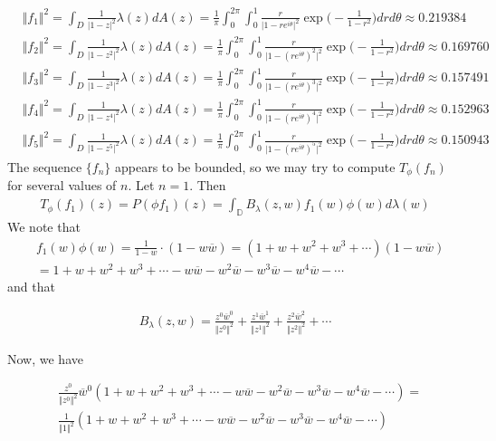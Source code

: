 \documentclass[12pt]{article}
\begin{document}
\begin{align*}
&\Vert f_1 \Vert^2 = \int_D \frac{1}{\vert 1 - z \vert^2} \lambda(z) dA(z) = \frac{1}{\pi} \int_0^{2\pi} \int_0^1 \frac{r}{\vert 1 - re^{i\theta} \vert^2} \exp\bigg(-\frac{1}{1-r^2}\bigg) dr d\theta \approx 0.219384 \\
&\Vert f_2 \Vert^2 = \int_D \frac{1}{\vert 1 - z^2 \vert^2} \lambda(z) dA(z) = \frac{1}{\pi} \int_0^{2\pi} \int_0^1 \frac{r}{\vert 1 - (re^{i\theta})^2 \vert^2} \exp\bigg(-\frac{1}{1-r^2}\bigg) dr d\theta \approx 0.169760 \\
&\Vert f_3 \Vert^2 = \int_D \frac{1}{\vert 1 - z^3 \vert^2} \lambda(z) dA(z) = \frac{1}{\pi} \int_0^{2\pi} \int_0^1 \frac{r}{\vert 1 - (re^{i\theta})^3 \vert^2} \exp\bigg(-\frac{1}{1-r^2}\bigg) dr d\theta \approx 0.157491\\
&\Vert f_4 \Vert^2 = \int_D \frac{1}{\vert 1 - z^4 \vert^2} \lambda(z) dA(z) = \frac{1}{\pi} \int_0^{2\pi} \int_0^1 \frac{r}{\vert 1 - (re^{i\theta})^4 \vert^2} \exp\bigg(-\frac{1}{1-r^2}\bigg) dr d\theta \approx 0.152963\\
&\Vert f_5 \Vert^2 = \int_D \frac{1}{\vert 1 - z^5 \vert^2} \lambda(z) dA(z) = \frac{1}{\pi} \int_0^{2\pi} \int_0^1 \frac{r}{\vert 1 - (re^{i\theta})^5 \vert^2} \exp\bigg(-\frac{1}{1-r^2}\bigg) dr d\theta \approx 0.150943
\end{align*}
The sequence $\{f_n\}$ appears to be bounded, so  we may try to compute $T_\phi(f_n)$ for several values of $n$. Let $n = 1$. Then
\begin{align}
T_\phi(f_1)(z) = P(\phi f_1)(z) = \int_\mathbb{D} B_\lambda(z,w) f_1(w) \phi(w) d\lambda(w)
\end{align}
We note that
\begin{align}
&f_1(w) \phi(w) = \frac{1}{1-w} \cdot (1-w\overline{w}) = (1 + w + w^2 + w^3 + \cdots)(1 - w\overline{w}) 
\\ &= 1 + w + w^2 + w^3 + \cdots - w \overline{w} - w^2 \overline{w} - w^3 \overline{w} - w^4 \overline{w} - \cdots
\end{align} and that

\begin{align}
B_\lambda(z,w) = \frac{z^0 \overline{w}^0}{\Vert z^0 \Vert^2} + \frac{z^1 \overline{w}^1}{\Vert z^1 \Vert^2} + \frac{z^2 \overline{w}^2}{\Vert z^2 \Vert^2} + \cdots 
\end{align}

 Now, we have

\begin{align}
&\frac{z^0}{\Vert z^0 \Vert^2} \overline{w}^0 (1 + w + w^2 + w^3 + \cdots - w\overline{w} - w^2\overline{w} - w^3 \overline{w} - w^4 \overline{w} - \cdots )=\\
& \frac{1}{\Vert 1 \Vert^2} (1 + w + w^2 + w^3 + \cdots - w\overline{w} - w^2\overline{w} - w^3 \overline{w} - w^4 \overline{w} -\cdots)
\end{align}
\end{document}
